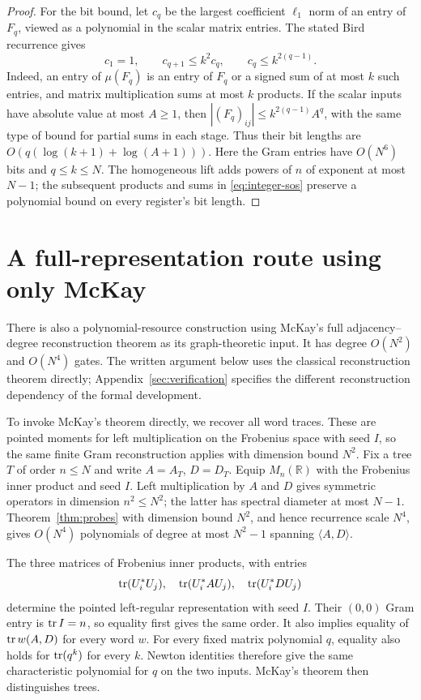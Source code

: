 \documentclass[11pt,letterpaper]{article}
\theoremstyle{definition}\newtheorem{definition}[theorem]{Definition}
\theoremstyle{remark}\newtheorem{remark}[theorem]{Remark}
\newcommand{\R}{\mathbb R}\newcommand{\Q}{\mathbb Q}\newcommand{\Z}{\mathbb Z}
\begin{document}
\begin{proof}
For the bit bound, let $c_q$ be the largest coefficient $\ell_1$ norm of an
entry of $F_q$, viewed as a polynomial in the scalar matrix entries.
The stated Bird recurrence gives
\[
c_1=1,\qquad c_{q+1}\le k^2c_q,\qquad c_q\le k^{2(q-1)}.
\]
Indeed, an entry of $\mu(F_q)$ is an entry of $F_q$ or a signed sum of at
most $k$ such entries, and matrix multiplication sums at most $k$ products.
If the scalar inputs have absolute value at most $A\ge1$, then
$|(F_q)_{ij}|\le k^{2(q-1)}A^q$, with the same type of bound for partial
sums in each stage. Thus their bit lengths are
$O(q(\log(k+1)+\log(A+1)))$.
Here the Gram entries have $O(N^6)$ bits and $q\le k\le N$.
The homogeneous lift adds powers of $n$ of exponent at most $N-1$;
the subsequent products and sums in \eqref{eq:integer-sos} preserve a
polynomial bound on every register's bit length.
\end{proof}

\section{A full-representation route using only McKay}\label{sec:fulltrace}
There is also a polynomial-resource construction using McKay's full adjacency--degree reconstruction theorem as its graph-theoretic input. It has degree $O(N^2)$ and $O(N^4)$ gates. The written argument below uses the classical reconstruction theorem directly; Appendix~\ref{sec:verification} specifies the different reconstruction dependency of the formal development.

To invoke McKay's theorem directly, we recover all word traces. These are
pointed moments for left multiplication on the Frobenius space with seed $I$,
so the same finite Gram reconstruction applies with dimension bound $N^2$.
Fix a tree $T$ of order $n\le N$ and write $A=A_T$, $D=D_T$. Equip $M_n(\R)$ with the Frobenius inner product and seed $I$. Left multiplication by $A$ and $D$ gives symmetric operators in dimension $n^2\le N^2$; the latter has spectral diameter at most $N-1$. Theorem~\ref{thm:probes} with dimension bound $N^2$, and hence recurrence scale $N^4$, gives $O(N^4)$ polynomials of degree at most $N^2-1$ spanning $\langle A,D\rangle$.

The three matrices of Frobenius inner products, with entries
\[
\operatorname{tr}(U_i^*U_j),\quad\operatorname{tr}(U_i^*AU_j),\quad\operatorname{tr}(U_i^*DU_j)
\]
determine the pointed left-regular representation with seed $I$. Their $(0,0)$ Gram entry is $\operatorname{tr} I=n$, so equality first gives the same order. It also implies equality of $\operatorname{tr} w(A,D)$ for every word $w$. For every fixed matrix polynomial $q$, equality also holds for $\operatorname{tr}(q^k)$ for every $k$. Newton identities therefore give the same characteristic polynomial for $q$ on the two inputs. McKay's theorem \cite[Theorem 5.3]{McKay} then distinguishes trees.
\end{document}
